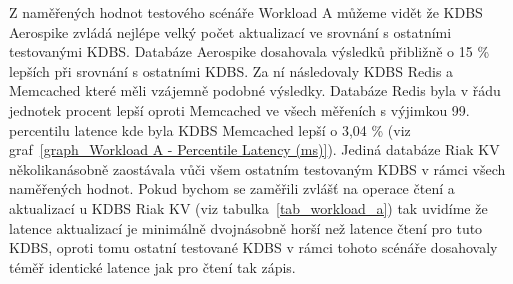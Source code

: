 \documentclass[czech,master,dept460,male,csharp,cpdeclaration]{diploma}
\begin{document}
	Z naměřených hodnot testového scénáře Workload A můžeme vidět že KDBS Aerospike zvládá nejlépe velký počet aktualizací ve srovnání s ostatními testovanými KDBS. Databáze Aerospike dosahovala výsledků přibližně o 15 \% lepších při srovnání s ostatními KDBS. Za ní následovaly KDBS Redis a Memcached které měli vzájemně podobné výsledky. Databáze Redis byla v řádu jednotek procent lepší oproti Memcached ve všech měřeních s výjimkou 99. percentilu latence kde byla KDBS Memcached lepší o 3,04 \% (viz graf~\ref{graph_Workload A - Percentile Latency (ms)}). Jediná databáze Riak KV několikanásobně zaostávala vůči všem ostatním testovaným KDBS v rámci všech naměřených hodnot. Pokud bychom se zaměřili zvlášť na operace čtení a aktualizací u KDBS Riak KV (viz tabulka~\ref{tab_workload_a}) tak uvidíme že latence aktualizací je minimálně dvojnásobně horší než latence čtení pro tuto KDBS, oproti tomu ostatní testované KDBS v rámci tohoto scénáře dosahovaly téměř identické latence jak pro čtení tak zápis.
	
\end{document}
